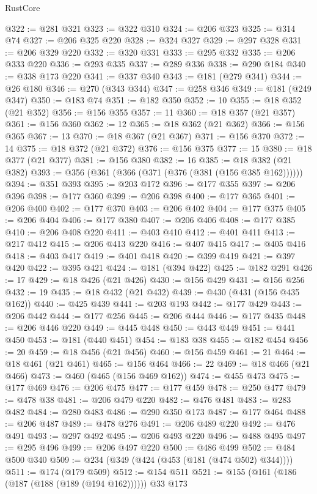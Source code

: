 \begin{lexlean}{RustCore}
\begin{coremodule}
@322 := @281 @321
@323 := @322 @310
@324 := @206 @323
@325 := @314 @74
@327 := @206 @325 @220
@328 := @324 @327
@329 := @297 @328
@331 := @206 @329 @220
@332 := @320 @331
@333 := @295 @332
@335 := @206 @333 @220
@336 := @293 @335
@337 := @289 @336
@338 := @290 @184
@340 := @338 @173 @220
@341 := @337 @340
@343 := @181 (@279 @341)
@344 := @26 @180
@346 := @270 (@343 @344)
@347 := @258 @346
@349 := @181 (@249 @347)
@350 := @183 @74
@351 := @182 @350
@352 := 10
@355 := @18 @352 (@21 @352)
@356 := @156 @355
@357 := 11
@360 := @18 @357 (@21 @357)
@361 := @156 @360
@362 := 12
@365 := @18 @362 (@21 @362)
@366 := @156 @365
@367 := 13
@370 := @18 @367 (@21 @367)
@371 := @156 @370
@372 := 14
@375 := @18 @372 (@21 @372)
@376 := @156 @375
@377 := 15
@380 := @18 @377 (@21 @377)
@381 := @156 @380
@382 := 16
@385 := @18 @382 (@21 @382)
@393 := @356 (@361 (@366 (@371 (@376 (@381 (@156 @385 @162))))))
@394 := @351 @393
@395 := @203 @172
@396 := @177 @355
@397 := @206 @396
@398 := @177 @360
@399 := @206 @398
@400 := @177 @365
@401 := @206 @400
@402 := @177 @370
@403 := @206 @402
@404 := @177 @375
@405 := @206 @404
@406 := @177 @380
@407 := @206 @406
@408 := @177 @385
@410 := @206 @408 @220
@411 := @403 @410
@412 := @401 @411
@413 := @217 @412
@415 := @206 @413 @220
@416 := @407 @415
@417 := @405 @416
@418 := @403 @417
@419 := @401 @418
@420 := @399 @419
@421 := @397 @420
@422 := @395 @421
@424 := @181 (@394 @422)
@425 := @182 @291
@426 := 17
@429 := @18 @426 (@21 @426)
@430 := @156 @429
@431 := @156 @256
@432 := 19
@435 := @18 @432 (@21 @432)
@439 := @430 (@431 (@156 @435 @162))
@440 := @425 @439
@441 := @203 @193
@442 := @177 @429
@443 := @206 @442
@444 := @177 @256
@445 := @206 @444
@446 := @177 @435
@448 := @206 @446 @220
@449 := @445 @448
@450 := @443 @449
@451 := @441 @450
@453 := @181 (@440 @451)
@454 := @183 @38
@455 := @182 @454
@456 := 20
@459 := @18 @456 (@21 @456)
@460 := @156 @459
@461 := 21
@464 := @18 @461 (@21 @461)
@465 := @156 @464
@466 := 22
@469 := @18 @466 (@21 @466)
@473 := @460 (@465 (@156 @469 @162))
@474 := @455 @473
@475 := @177 @469
@476 := @206 @475
@477 := @177 @459
@478 := @250 @477
@479 := @478 @38
@481 := @206 @479 @220
@482 := @476 @481
@483 := @283 @482
@484 := @280 @483
@486 := @290 @350 @173
@487 := @177 @464
@488 := @206 @487
@489 := @478 @276
@491 := @206 @489 @220
@492 := @476 @491
@493 := @297 @492
@495 := @206 @493 @220
@496 := @488 @495
@497 := @295 @496
@499 := @206 @497 @220
@500 := @486 @499
@502 := @484 @500 @340
@509 := @234 (@349 (@424 (@453 (@181 (@474 @502) @344))))
@511 := @174 (@179 @509)
@512 := @154 @511
@521 := @155 (@161 (@186 (@187 (@188 (@189 (@194 @162)))))) @33 @173

\end{coremodule}
\end{lexlean}
